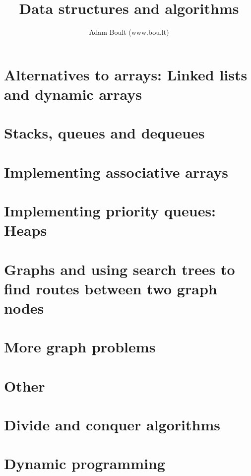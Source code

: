 \documentclass[oneside]{book}
\begin{document}
\author{Adam Boult (www.bou.lt)}
\title{Data structures and algorithms}
\maketitle

\setcounter{tocdepth}{0}
\tableofcontents



\part{Alternatives to arrays: Linked lists and dynamic arrays}







\part{Stacks, queues and dequeues}




\part{Implementing associative arrays}






\part{Implementing priority queues: Heaps}



\part{Graphs and using search trees to find routes between two graph nodes}





\part{More graph problems}




\part{Other}


\part{Divide and conquer algorithms}


\part{Dynamic programming}


\end{document}
